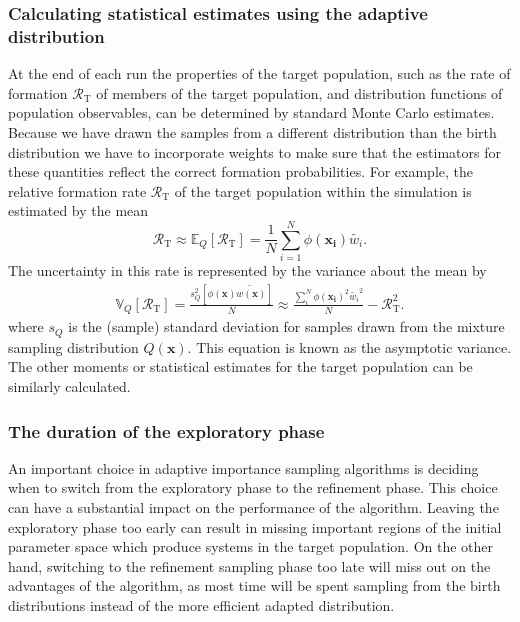 \documentclass[a4paper,fleqn,usenatbib,useAMS,usedcolumn]{mnras}
\newcommand\rate{\mathcal{R}}
\begin{document}
\subsubsection{Calculating statistical estimates using the adaptive distribution}
\label{subsec:AISstatistic}
At the end of each run the properties of the target population, such as the rate of formation $\rate_{\text{T}}$ of members of the target population, and distribution functions of population observables, can be determined by standard Monte Carlo estimates.  Because we have drawn the samples from a different distribution than the birth distribution we have to incorporate weights to make sure that the estimators for these quantities reflect the correct formation probabilities.   
For example, the relative formation rate $\rate_{\text{T}}$ of the target population within the simulation is estimated by the mean
%
\begin{equation}
	\rate_{\text{T}} \approx 	{\mathbb{E}_Q[\rate_{\text{T}}]} = \frac{1}{N} \sum_{i=1}^{N} 
	\phi(\boldsymbol{x_i}) \widetilde{w_i}.	
	\label{eq:ISestimator}
\end{equation}
%
The uncertainty in this rate is represented by the variance about the mean by
%
\begin{align}
	{\mathbb{V}_Q[\rate_{\text{T}}]}
	= \frac{s^2_Q[\phi({\boldsymbol{x}})\widetilde{{w(\boldsymbol{x})}}] }{N} \approx \frac{\sum_i^N  \phi(\boldsymbol{x_i})^2  \widetilde{w_i}^2}{N} - \rate_{\text{T}}^2.
	\label{eq:variance}
\end{align}
where $s_Q$ is the (sample) standard deviation for samples drawn from the mixture sampling distribution $Q(\boldsymbol{x})$. 
This equation is known as the asymptotic variance.  
The other moments or statistical estimates for the target population can be similarly calculated.


\subsubsection{The duration of the exploratory phase}
\label{subsec:durationExploratory}
An important choice in adaptive importance sampling algorithms is deciding when to switch from the exploratory phase to the refinement phase. This choice can have a substantial impact on the performance of the algorithm. 
Leaving the exploratory phase too early can result in missing important regions of the initial parameter space which produce systems in the target population.   On the other hand, switching to the refinement sampling phase too late will miss out on the advantages of the algorithm, as most time will be spent sampling from the birth distributions instead of the more efficient adapted distribution. 
\end{document}
